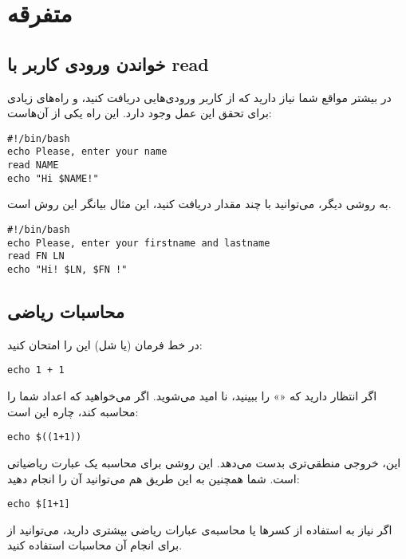 \chapter{متفرقه}
\section*{خواندن ورودی‌ کاربر با {\codefont read}}
در بیشتر مواقع شما نیاز دارید که از کاربر ورودی‌هایی دریافت کنید‌، و راه‌های زیادی
برای تحقق این عمل وجود دارد‌. این راه یکی از آن‌هاست‌:
\begin{latin}
\begin{lstlisting}
#!/bin/bash
echo Please, enter your name
read NAME
echo "Hi $NAME!"
\end{lstlisting}
\end{latin}
به روشی دیگر‌، می‌توانید با  چند مقدار دریافت کنید‌، این مثال بیانگر این روش
است.
\begin{latin}
\begin{lstlisting}
#!/bin/bash
echo Please, enter your firstname and lastname
read FN LN
echo "Hi! $LN, $FN !"
\end{lstlisting}
\end{latin}

\section*{محاسبات ریاضی}
در خط فرمان (یا شل) این را امتحان کنید‌:
\begin{latin}
\begin{lstlisting}
echo 1 + 1
\end{lstlisting}
\end{latin}
اگر انتظار دارید که «» را ببینید‌، نا امید می‌شوید‌. اگر می‌خواهید که  اعداد
شما را محاسبه کند‌، چاره این است‌:
\begin{latin}
\begin{lstlisting}
echo $((1+1))
\end{lstlisting}
\end{latin}
این، خروجی منطقی‌تری بدست می‌دهد. این روشی برای محاسبه یک عبارت ریاضیاتی است‌. شما
همچنین به این طریق هم می‌توانید آن را انجام دهید‌:
\begin{latin}
\begin{lstlisting}
echo $[1+1]
\end{lstlisting}
\end{latin}
اگر نیاز به استفاده از کسرها یا محاسبه‌ی عبارات ریاضی بیشتری دارید، می‌توانید از
 برای انجام آن محاسبات استفاده کنید‌.

